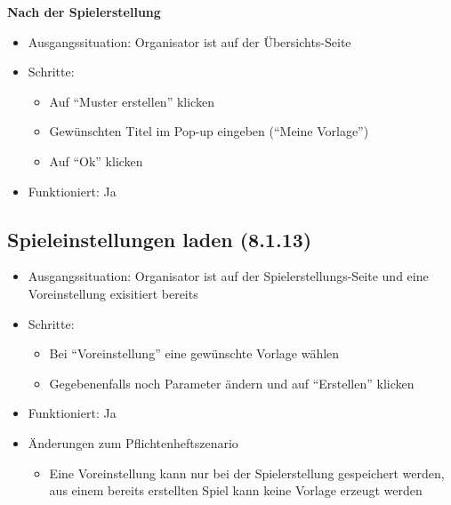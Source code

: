 \documentclass[a4paper]{scrreprt}
\begin{document}
            \textbf{Nach der Spielerstellung}
            \begin{itemize}
                \item Ausgangssituation: Organisator ist auf der Übersichts-Seite
                \item Schritte:
                    \begin{itemize}
                        \item Auf \enquote{Muster erstellen} klicken
                        \item Gewünschten Titel im Pop-up eingeben (\enquote{Meine Vorlage})
                        \item Auf \enquote{Ok} klicken
                \end{itemize}
                \item Funktioniert: Ja
            \end{itemize}

            \subsection{Spieleinstellungen laden (8.1.13)}
            \begin{itemize}
                \item Ausgangssituation: Organisator ist auf der Spielerstellungs-Seite und eine Voreinstellung exisitiert bereits
                \item Schritte:
                    \begin{itemize}
                        \item Bei \enquote{Voreinstellung} eine gewünschte Vorlage wählen
                        \item Gegebenenfalls noch Parameter ändern und auf \enquote{Erstellen} klicken
                    \end{itemize}
                \item Funktioniert: Ja
                \item Änderungen zum Pflichtenheftszenario
                \begin{itemize}
                    \item Eine Voreinstellung kann nur bei der Spielerstellung gespeichert werden, aus einem bereits erstellten Spiel kann keine Vorlage erzeugt werden
                \end{itemize}
            \end{itemize}
\end{document}
